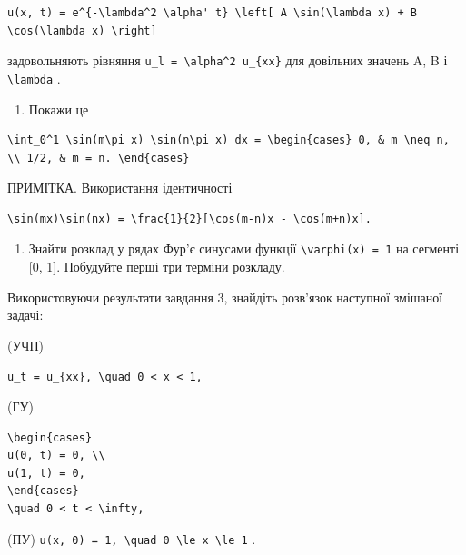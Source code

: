 \documentclass[
  ukrainian,
]{article}
\providecommand{\tightlist}{%
  \setlength{\itemsep}{0pt}\setlength{\parskip}{0pt}}
\begin{document}
\begin{verbatim}
u(x, t) = e^{-\lambda^2 \alpha' t} \left[ A \sin(\lambda x) + B \cos(\lambda x) \right]
\end{verbatim}

задовольняють рівняння
\texttt{u\_l\ =\ \textbackslash{}alpha\^{}2\ u\_\{xx\}} для довільних
значень A, B і \texttt{\textbackslash{}lambda} .

\begin{enumerate}
\def\labelenumi{\arabic{enumi}.}
\setcounter{enumi}{1}
\tightlist
\item
  Покажи це
\end{enumerate}

\begin{verbatim}
\int_0^1 \sin(m\pi x) \sin(n\pi x) dx = \begin{cases} 0, & m \neq n, \\ 1/2, & m = n. \end{cases}
\end{verbatim}

ПРИМІТКА. Використання ідентичності

\begin{verbatim}
\sin(mx)\sin(nx) = \frac{1}{2}[\cos(m-n)x - \cos(m+n)x].
\end{verbatim}

\begin{enumerate}
\def\labelenumi{\arabic{enumi}.}
\setcounter{enumi}{2}
\tightlist
\item
  Знайти розклад у рядах Фур'є синусами функції
  \texttt{\textbackslash{}varphi(x)\ =\ 1} на сегменті {[}0, 1{]}.
  Побудуйте перші три терміни розкладу.
\end{enumerate}

Використовуючи результати завдання 3, знайдіть розв'язок наступної
змішаної задачі:

(УЧП)

\begin{verbatim}
u_t = u_{xx}, \quad 0 < x < 1,
\end{verbatim}

(ГУ)

\begin{verbatim}
\begin{cases}
u(0, t) = 0, \\
u(1, t) = 0,
\end{cases}
\quad 0 < t < \infty,
\end{verbatim}

(ПУ)
\texttt{u(x,\ 0)\ =\ 1,\ \textbackslash{}quad\ 0\ \textbackslash{}le\ x\ \textbackslash{}le\ 1}
.
\end{document}
